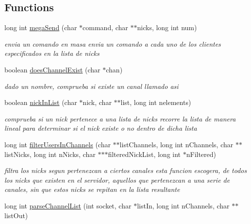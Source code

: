 \subsection*{Functions}
\begin{DoxyCompactItemize}
\item 
long int \hyperlink{_g-2301-05-_p1-commands_8c_a5844fb12c3cab624c83fc0ccff9946db}{mega\-Send} (char $\ast$command, char $\ast$$\ast$nicks, long int num)
\begin{DoxyCompactList}\small\item\em envia un comando en masa envia un comando a cada uno de los clientes especificados en la lista de nicks \end{DoxyCompactList}\item 
boolean \hyperlink{_g-2301-05-_p1-commands_8c_a5e779729087524b180ae301bcd4358ed}{does\-Channel\-Exist} (char $\ast$chan)
\begin{DoxyCompactList}\small\item\em dado un nombre, comprueba si existe un canal llamado asi \end{DoxyCompactList}\item 
boolean \hyperlink{_g-2301-05-_p1-commands_8c_af1c56216e57d9921473f3ceb1a9a7699}{nick\-In\-List} (char $\ast$nick, char $\ast$$\ast$list, long int nelements)
\begin{DoxyCompactList}\small\item\em comprueba si un nick pertenece a una lista de nicks recorre la lista de manera lineal para determinar si el nick existe o no dentro de dicha lista \end{DoxyCompactList}\item 
long int \hyperlink{_g-2301-05-_p1-commands_8c_a02944755d02164cf484a4c933ed2f0c3}{filter\-Users\-In\-Channels} (char $\ast$$\ast$list\-Channels, long int n\-Channels, char $\ast$$\ast$list\-Nicks, long int n\-Nicks, char $\ast$$\ast$$\ast$filtered\-Nick\-List, long int $\ast$n\-Filtered)
\begin{DoxyCompactList}\small\item\em filtra los nicks segun pertenezcan a ciertos canales esta funcion escogera, de todos los nicks que existen en el servidor, aquellos que pertenezcan a una serie de canales, sin que estos nicks se repitan en la lista resultante \end{DoxyCompactList}\item 
long int \hyperlink{_g-2301-05-_p1-commands_8c_a14fe4308f03717920b58dd81074d1fa1}{parse\-Channel\-List} (int socket, char $\ast$list\-In, long int n\-Channels, char $\ast$$\ast$list\-Out)
$$
\end{DoxyCompactItemize}
